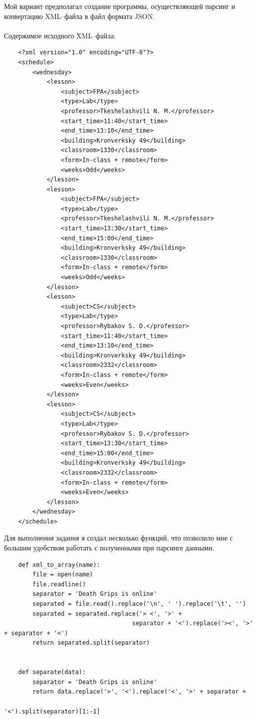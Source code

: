 \documentclass[12pt]{article}
\begin{document}
Мой вариант предполагал создание программы, осуществляющей парсинг и конвертацию XML--файла в файл формата JSON.\\
\\
Содержимое исходного XML--файла:

\begin{verbatim}
    <?xml version="1.0" encoding="UTF-8"?>
    <schedule>
        <wednesday>
            <lesson>
                <subject>FPA</subject>
                <type>Lab</type>
                <professor>Tkeshelashvili N. M.</professor>
                <start_time>11:40</start_time>
                <end_time>13:10</end_time>
                <building>Kronverksky 49</building>
                <classroom>1330</classroom>
                <form>In-class + remote</form>
                <weeks>Odd</weeks>
            </lesson>
            <lesson>
                <subject>FPA</subject>
                <type>Lab</type>
                <professor>Tkeshelashvili N. M.</professor>
                <start_time>13:30</start_time>
                <end_time>15:00</end_time>
                <building>Kronverksky 49</building>
                <classroom>1330</classroom>
                <form>In-class + remote</form>
                <weeks>Odd</weeks>
            </lesson>
            <lesson>
                <subject>CS</subject>
                <type>Lab</type>
                <professor>Rybakov S. D.</professor>
                <start_time>11:40</start_time>
                <end_time>13:10</end_time>
                <building>Kronverksky 49</building>
                <classroom>2332</classroom>
                <form>In-class + remote</form>
                <weeks>Even</weeks>
            </lesson>
            <lesson>
                <subject>CS</subject>
                <type>Lab</type>
                <professor>Rybakov S. D.</professor>
                <start_time>13:30</start_time>
                <end_time>15:00</end_time>
                <building>Kronverksky 49</building>
                <classroom>2332</classroom>
                <form>In-class + remote</form>
                <weeks>Even</weeks>
            </lesson>
        </wednesday>
    </schedule>
\end{verbatim}

Для выполнения задания я создал несколько функций, что позволило мне с большим удобством работать с полученными при парсинге данными.\\

\begin{verbatim}
    def xml_to_array(name):
        file = open(name)
        file.readline()
        separator = 'Death Grips is online'
        separated = file.read().replace('\n', ' ').replace('\t', '')
        separated = separated.replace('> <', '>' + 
                                    separator + '<').replace('><', '>' + separator + '<')
        return separated.split(separator)


    def separate(data):
        separator = 'Death Grips is online'
        return data.replace('>', '<').replace('<', '>' + separator + 
                                                            '<').split(separator)[1:-1]
\end{verbatim}
\end{document}
